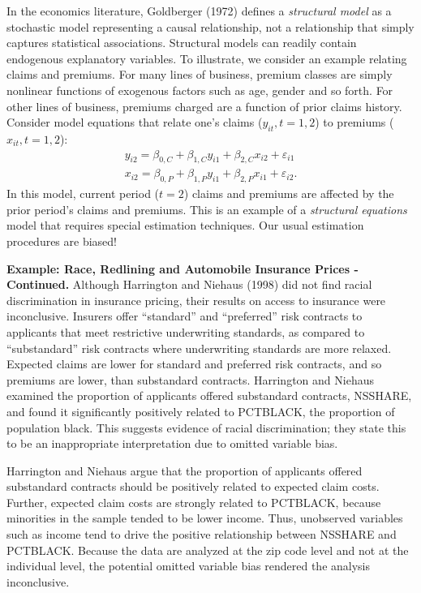 In the economics literature, Goldberger (1972) defines a
\emph{structural model} as a stochastic model representing a causal
relationship, not a relationship that simply captures statistical
associations. Structural models can readily contain endogenous
explanatory variables. To illustrate, we consider an example
relating claims and premiums. For many lines of business, premium
classes are simply nonlinear functions of exogenous factors such as
age, gender and so forth. For other lines of business, premiums
charged are a function of prior claims history. Consider model
equations that relate one's claims  ($y_{it}, t=1, 2$) to premiums
($x_{it}, t=1, 2$):
 \begin{eqnarray*}
 y_{i2} = \beta_{0,C} + \beta_{1,C} y_{i1} + \beta_{2,C} x_{i2} +
\varepsilon_{i1} \\
 x_{i2} = \beta_{0,P} + \beta_{1,P}  y_{i1} + \beta_{2,P}  x_{i1}
+\varepsilon_{i2} .
 \end{eqnarray*}
In this model, current period ($t=2$) claims and premiums are
affected by the prior period's claims and premiums. This is an
example of a \emph{structural equations} model that requires special
estimation techniques. Our usual estimation procedures are biased!

\linejed{}

\textbf{Example: Race, Redlining and Automobile Insurance Prices -
Continued.} Although Harrington and Niehaus (1998) did not find
racial discrimination in insurance pricing, their results on access
to insurance were inconclusive. Insurers offer ``standard'' and
``preferred'' risk contracts to applicants that meet restrictive
underwriting standards, as compared to ``substandard'' risk
contracts where underwriting standards are more relaxed. Expected
claims are lower for standard and preferred risk contracts, and so
premiums are lower, than substandard contracts. Harrington and
Niehaus examined the proportion of applicants offered substandard
contracts, NSSHARE, and found it significantly positively related to
PCTBLACK, the proportion of population black. This suggests evidence
of racial discrimination; they state this to be an inappropriate
interpretation due to omitted variable bias.

Harrington and Niehaus argue that the proportion of applicants
offered substandard contracts should be positively related to
expected claim costs. Further, expected claim costs are strongly
related to PCTBLACK, because minorities in the sample tended to be
lower income. Thus, unobserved variables such as income tend to
drive the positive relationship between NSSHARE and PCTBLACK.
Because the data are analyzed at the zip code level and not at the
individual level, the potential omitted variable bias rendered the
analysis inconclusive.



